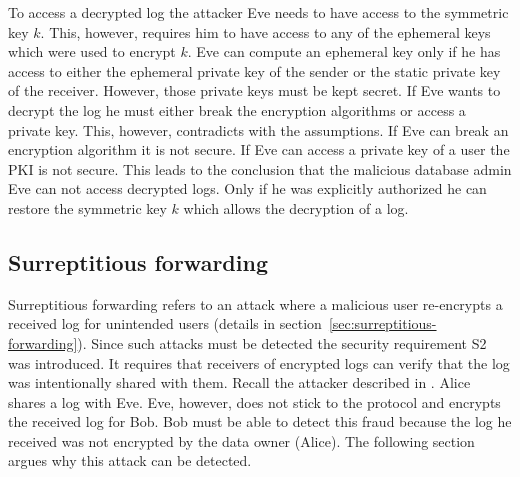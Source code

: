 \documentclass[../main.tex]{subfiles}
\begin{document}
To access a decrypted log the attacker Eve needs to have access to the symmetric key $k$.
This, however, requires him to have access to any of the ephemeral keys which were used to encrypt $k$.
Eve can compute an ephemeral key only if he has access to either the ephemeral private key of the sender or the static private key of the receiver.
However, those private keys must be kept secret.
If Eve wants to decrypt the log he must either break the encryption algorithms or access a private key.
This, however, contradicts with the assumptions.
If Eve can break an encryption algorithm it is not secure.
If Eve can access a private key of a user the PKI is not secure.
This leads to the conclusion that the malicious database admin Eve can not access decrypted logs.
Only if he was explicitly authorized he can restore the symmetric key $k$ which allows the decryption of a log.


\subsection{Surreptitious forwarding}
Surreptitious forwarding refers to an attack where a malicious user re-encrypts a received log for unintended users (details in section~\ref{sec:surreptitious-forwarding}).
Since such attacks must be detected the security requirement S2 was introduced.
It requires that receivers of encrypted logs can verify that the log was intentionally shared with them.
Recall the attacker described in .
Alice shares a log with Eve.
Eve, however, does not stick to the protocol and encrypts the received log for Bob.
Bob must be able to detect this fraud because the log he received was not encrypted by the data owner (Alice).
The following section argues why this attack can be detected.
\end{document}
